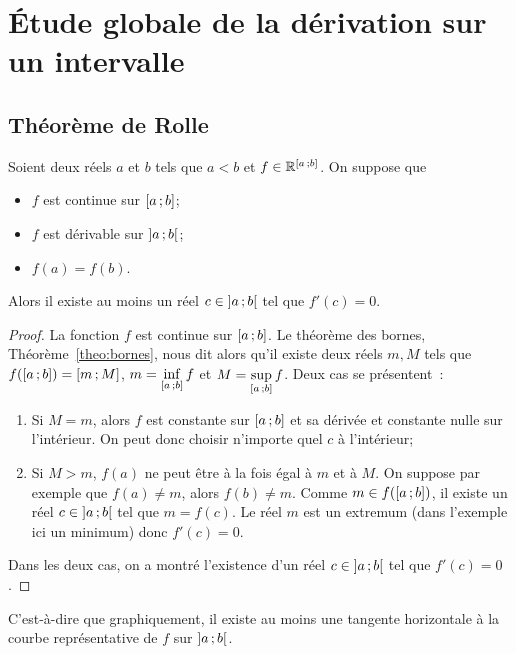 \section{Étude globale de la dérivation sur un intervalle}

\subsection{Théorème de Rolle}

\begin{theo}
  Soient deux réels \(a\) et \(b\) tels que \(a < b\) et \(f \in
  \mathbb{R}^{\left[ a \, ; {} b \right]}\). On suppose que
  \begin{itemize}
    \item \(f\) est continue sur \(\left[ a \, ; {} b \right]\);
    \item \(f\) est dérivable sur \(\left] a \, ; {} b \right[\);
    \item \(f(a)=f(b)\).
  \end{itemize}
  Alors il existe au moins un réel \(c \in \left] a \, ; {} b \right[\) tel que
  \(f'(c)=0\).
\end{theo}
\begin{proof}
  La fonction \(f\) est continue sur \(\left[ a \, ; {} b \right]\). Le théorème des
  bornes, Théorème~\ref{theo:bornes}, nous dit alors qu'il existe deux réels
  \(m,M\) tels que
  \(f(\left[ a \, ; {} b \right])=\left[ m \, ; {} M \right]\), \(m =
  \inf\limits_{\left[ a \, ; {} b \right]} f\) et \(M =
  \sup\limits_{\left[ a \, ; {} b \right]} f\). Deux cas se présentent~:
  \begin{enumerate}
    \item Si \(M=m\), alors \(f\) est constante sur \(\left[ a \, ; {} b \right]\) et
      sa dérivée et constante nulle sur l'intérieur. On peut donc choisir
      n'importe quel \(c\) à l'intérieur;
    \item Si \(M > m\), \(f(a)\) ne peut être à la fois égal à \(m\) et à \(M\).
      On suppose par exemple que \(f(a) \neq m\), alors \(f(b) \neq m\). Comme
      \(m \in f(\left[ a \, ; {} b \right])\), il existe un réel \(c \in
      \left] a \, ; {} b \right[\) tel que \(m=f(c)\). Le réel \(m\) est un extremum
      (dans l'exemple ici un minimum) donc \(f'(c)=0\).
  \end{enumerate}
  Dans les deux cas, on a montré l'existence d'un réel \(c \in
  \left] a \, ; {} b \right[\) tel que \(f'(c)=0\).
\end{proof}

C'est-à-dire que graphiquement, il existe au moins une tangente horizontale à la
courbe représentative de \(f\) sur \(\left] a \, ; {} b \right[\).

